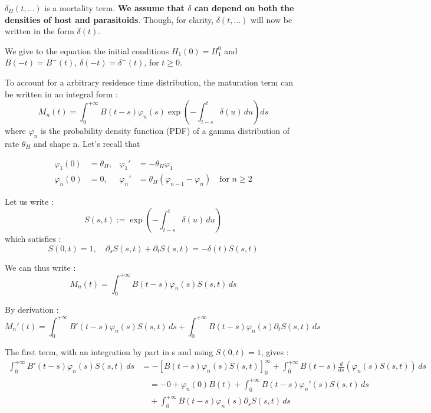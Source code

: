 \documentclass[12pt,a4paper,onecolumn]{article}
\begin{document}
$\delta_H(t, ...)$ is a mortality term. \textbf{We assume that $\delta$ can depend on both the densities of host and parasitoids}. Though, for clarity, $\delta(t, ...)$ will now be written in the form $\delta(t)$.

We give to the equation the initial conditions $H_1(0) = H_1^0$ and $B(-t) = B^{-}(t)$, $\delta(-t) = \delta^{-}(t)$, for $t \geq 0$.

To account for a arbitrary residence time distribution, the maturation term can be written in an integral form :
\begin{equation}
M_n(t) = \int_0^{+\infty} B(t-s)\varphi_n(s) \exp\left( -\int_{t-s}^{t} \delta(u) \, du \right) ds
\end{equation}
where $\varphi_n$ is the probability density function (PDF) of a gamma distribution of rate $\theta_H$ and shape n. Let's recall that

\begin{align}
\varphi_1(0) &= \theta_H, & \varphi_1' &= -\theta_H \varphi_1 \\
\varphi_n(0) &= 0, & \varphi_n' &= \theta_H (\varphi_{n-1} - \varphi_n) \quad \text{for } n \geq 2
\end{align}

Let us write :
\[
S(s, t) := \exp\left( -\int_{t-s}^{t} \delta(u) \, du \right)
\]
which satisfies :
\begin{equation}
S(0, t) = 1, \quad \partial_s S(s,t) + \partial_t S(s,t) = -\delta(t) S(s,t)
\end{equation}

We can thus write :
\begin{equation}
M_n(t) = \int_0^{+\infty} B(t-s)\varphi_n(s)S(s,t) \, ds
\end{equation}

By derivation :
\[
M_n'(t) = \int_0^{+\infty} B'(t-s)\varphi_n(s)S(s,t) \, ds + \int_0^{+\infty} B(t-s)\varphi_n(s) \partial_t S(s,t) \, ds
\]

The first term, with an integration by part in s and using $S(0,t) = 1$, gives :
\begin{align*}
\int_0^{+\infty} B'(t-s)\varphi_n(s)S(s,t) \, ds &= -[B(t-s) \varphi_n(s) S(s,t) ]_{0}^{\infty} + \int_0^{+\infty} B(t-s)\frac{d}{ds}(\varphi_n(s)S(s,t)) \, ds \\
&\quad = -0 + \varphi_n(0) B(t) + \int_0^{+\infty} B(t-s)\varphi_n'(s) S(s,t) \, ds \\
&\quad + \int_0^{+\infty} B(t-s)\varphi_n(s) \partial_s S(s,t) \, ds
\end{align*}
\end{document}
